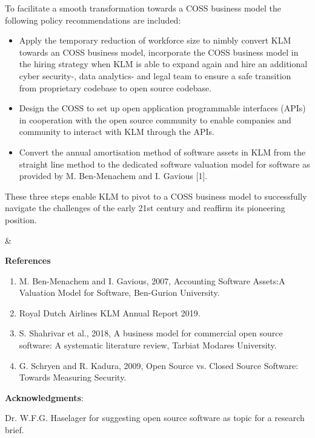 \documentclass[portrait,a0paper]{rudi-poster}  %
\newcommand{\References}{
    \textbf{References}%
    \begin{enumerate}
    \itemsep-1em 
\item  M. Ben-Menachem and I. Gavious, 2007, Accounting Software Assets:A Valuation Model for Software,  Ben-Gurion University.\\ %
\item Royal Dutch Airlines KLM Annual Report 2019.\\ %
\item S. Shahrivar et al., 2018, A business model for commercial open source software: A systematic literature review, Tarbiat Modares University.\\ %
\item G. Schryen and R. Kadura, 2009, Open Source vs. Closed Source Software: Towards Measuring Security. %
\end{enumerate}}
\newcommand{\Acknowledgments}{
	\textbf{Acknowledgments}:
    \begin{itemize*}[label=]
    	\item Dr. W.F.G. Haselager for suggesting open source software as topic for a research brief.
    \end{itemize*}}
\begin{document}

\begin{paralleltwoblocks}{0.67}
    \begin{rudiblockipolicyrecommendations}
        \begin{multicols}{2}
            To facilitate a smooth transformation towards a COSS business model the following policy recommendations are included:
            \begin{itemize}
                \item Apply the temporary reduction of workforce size to nimbly convert KLM towards an COSS business model, incorporate the COSS business model in the hiring strategy when KLM is able to expand again and hire an additional cyber security-, data analytics- and legal team to ensure a safe transition from proprietary codebase to open source codebase.
                \item Design the COSS to set up open application programmable interfaces (APIs) in cooperation with the open source community to enable companies and community to interact with KLM through the APIs.
                \item Convert the annual amortisation method of software assets in KLM from the straight line method to the dedicated software valuation model for software as provided by M. Ben-Menachem and I. Gavious [1].
            \end{itemize}
            These three steps enable KLM to pivot to a COSS business model to successfully navigate the challenges of the early 21st century and reaffirm its pioneering position.
        \end{multicols}
    \end{rudiblockipolicyrecommendations}
    &
    {
    \begin{rudiblockaddendum}
    	\small
    	\References\par
        \Acknowledgments\par
        

\end{rudiblockaddendum}}
\end{paralleltwoblocks}
\end{document}
